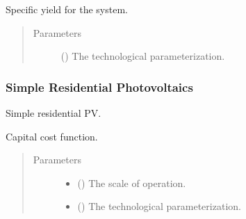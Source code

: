 \documentclass[letterpaper,10pt,english]{sphinxmanual}
\begin{document}
\begin{fulllineitems}
\label{\detokenize{technology:technology.pv_residential_large.specific_yield}}
Specific yield for the system.
\begin{quote}\begin{description}
\item[{Parameters}] \leavevmode
{} () \textendash{} The technological parameterization.

\end{description}\end{quote}

\end{fulllineitems}



\subsubsection{Simple Residential Photovoltaics}
\label{\detokenize{technology:module-technology.pv_residential_simple}}\label{\detokenize{technology:simple-residential-photovoltaics}}\label{\detokenize{technology:sec-simplerespv}}
Simple residential PV.

\begin{fulllineitems}
\label{\detokenize{technology:technology.pv_residential_simple.capital_cost}}
Capital cost function.
\begin{quote}\begin{description}
\item[{Parameters}] \leavevmode\begin{itemize}
\item {} 
 () \textendash{} The scale of operation.

\item {} 
 () \textendash{} The technological parameterization.

\end{itemize}

\end{description}\end{quote}

\end{fulllineitems}
\end{document}
